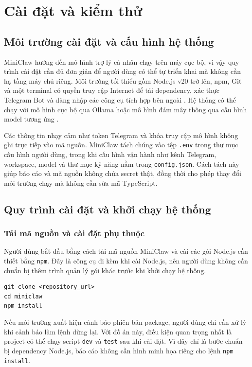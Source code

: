 \chapter{Cài đặt và kiểm thử}
\label{chap:implementation-evaluation}

\section{Môi trường cài đặt và cấu hình hệ thống}
MiniClaw hướng đến mô hình trợ lý cá nhân chạy trên máy cục bộ, vì vậy quy trình cài đặt cần đủ đơn giản để người dùng có thể tự triển khai mà không cần hạ tầng máy chủ riêng. Môi trường tối thiểu gồm Node.js v20 trở lên, npm, Git và một terminal có quyền truy cập Internet để tải dependency, xác thực Telegram Bot và đăng nhập các công cụ tích hợp bên ngoài \cite{nodejsDocs}. Hệ thống có thể chạy với mô hình cục bộ qua Ollama hoặc mô hình đám mây thông qua cấu hình model tương ứng \cite{ollamaDocs}.

Các thông tin nhạy cảm như token Telegram và khóa truy cập mô hình không ghi trực tiếp vào mã nguồn. MiniClaw tách chúng vào tệp \texttt{.env} trong thư mục cấu hình người dùng, trong khi cấu hình vận hành như kênh Telegram, workspace, model và thư mục kỹ năng nằm trong \texttt{config.json}. Cách tách này giúp báo cáo và mã nguồn không chứa secret thật, đồng thời cho phép thay đổi môi trường chạy mà không cần sửa mã TypeScript.

\section{Quy trình cài đặt và khởi chạy hệ thống}
\subsection{Tải mã nguồn và cài đặt phụ thuộc}
Người dùng bắt đầu bằng cách tải mã nguồn MiniClaw và cài các gói Node.js cần thiết bằng \texttt{npm}. Đây là công cụ đi kèm khi cài Node.js, nên người dùng không cần chuẩn bị thêm trình quản lý gói khác trước khi khởi chạy hệ thống.

\begin{lstlisting}[caption={Lệnh tải mã nguồn và cài đặt dependency bằng npm.},label={lst:npm-install}]
git clone <repository_url>
cd miniclaw
npm install
\end{lstlisting}

Nếu môi trường xuất hiện cảnh báo phiên bản package, người dùng chỉ cần xử lý khi cảnh báo làm lệnh dừng lại. Với đồ án này, điều kiện quan trọng nhất là project có thể chạy script \texttt{dev} và \texttt{test} sau khi cài đặt. Vì đây chỉ là bước chuẩn bị dependency Node.js, báo cáo không cần hình minh họa riêng cho lệnh \texttt{npm install}.


